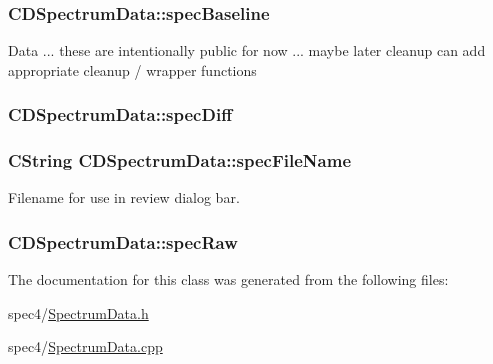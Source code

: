 \hypertarget{classCDSpectrumData_a910af6c1fe89fdda34d1dfc97f5cbed4}{
\subsubsection[{specBaseline}]{ {\bf CDSpectrumData::specBaseline}}}
\label{classCDSpectrumData_a910af6c1fe89fdda34d1dfc97f5cbed4}
Data ... these are intentionally public for now ... maybe later cleanup can add appropriate cleanup / wrapper functions \hypertarget{classCDSpectrumData_a37814cb5808f3445fc9bee05547d4a95}{
\subsubsection[{specDiff}]{ {\bf CDSpectrumData::specDiff}}}
\label{classCDSpectrumData_a37814cb5808f3445fc9bee05547d4a95}
\hypertarget{classCDSpectrumData_adcfd9086f45d3809b7ad12cf30469786}{
\subsubsection[{specFileName}]{\setlength{\rightskip}{0pt plus 5cm}CString {\bf CDSpectrumData::specFileName}}}
\label{classCDSpectrumData_adcfd9086f45d3809b7ad12cf30469786}


Filename for use in review dialog bar. 

\hypertarget{classCDSpectrumData_aa41bef09f10b5b025fd102284893c60e}{
\subsubsection[{specRaw}]{ {\bf CDSpectrumData::specRaw}}}
\label{classCDSpectrumData_aa41bef09f10b5b025fd102284893c60e}


The documentation for this class was generated from the following files:\begin{DoxyCompactItemize}
\item 
spec4/\hyperlink{SpectrumData_8h}{SpectrumData.h}\item 
spec4/\hyperlink{SpectrumData_8cpp}{SpectrumData.cpp}\end{DoxyCompactItemize}
